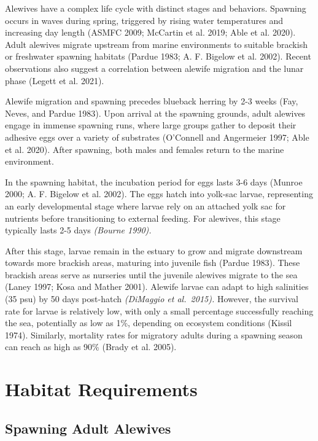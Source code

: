 \documentclass[
]{book}
\begin{document}
Alewives have a complex life cycle with distinct stages and behaviors. Spawning occurs in waves during spring, triggered by rising water temperatures and increasing day length (ASMFC 2009; McCartin et al. 2019; Able et al. 2020). Adult alewives migrate upstream from marine environments to suitable brackish or freshwater spawning habitats (Pardue 1983; A. F. Bigelow et al. 2002). Recent observations also suggest a correlation between alewife migration and the lunar phase (Legett et al. 2021).

Alewife migration and spawning precedes blueback herring by 2-3 weeks (Fay, Neves, and Pardue 1983). Upon arrival at the spawning grounds, adult alewives engage in immense spawning runs, where large groups gather to deposit their adhesive eggs over a variety of substrates (O'Connell and Angermeier 1997; Able et al. 2020). After spawning, both males and females return to the marine environment.

In the spawning habitat, the incubation period for eggs lasts 3-6 days (Munroe 2000; A. F. Bigelow et al. 2002). The eggs hatch into yolk-sac larvae, representing an early developmental stage where larvae rely on an attached yolk sac for nutrients before transitioning to external feeding. For alewives, this stage typically lasts 2-5 days \emph{(Bourne 1990).}

After this stage, larvae remain in the estuary to grow and migrate downstream towards more brackish areas, maturing into juvenile fish (Pardue 1983). These brackish areas serve as nurseries until the juvenile alewives migrate to the sea (Laney 1997; Kosa and Mather 2001). Alewife larvae can adapt to high salinities (35 psu) by 50 days post-hatch \emph{(DiMaggio et al.~2015).} However, the survival rate for larvae is relatively low, with only a small percentage successfully reaching the sea, potentially as low as 1\%, depending on ecosystem conditions (Kissil 1974). Similarly, mortality rates for migratory adults during a spawning season can reach as high as 90\% (Brady et al. 2005).

\hypertarget{habitat-requirements}{%
\section{Habitat Requirements}\label{habitat-requirements}}

\hypertarget{spawning-adult-alewives}{%
\subsection{Spawning Adult Alewives}\label{spawning-adult-alewives}}
\end{document}
